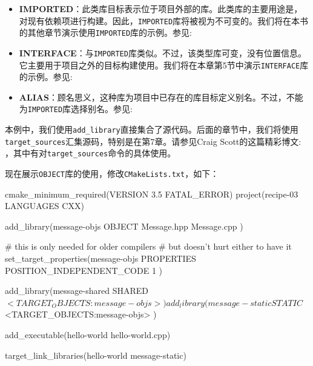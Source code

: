 \begin{itemize}
\item \textbf{IMPORTED}：此类库目标表示位于项目外部的库。此类库的主要用途是，对现有依赖项进行构建。因此，\texttt{IMPORTED}库将被视为不可变的。我们将在本书的其他章节演示使用\texttt{IMPORTED}库的示例。参见: 

\item \textbf{INTERFACE}：与\texttt{IMPORTED}库类似。不过，该类型库可变，没有位置信息。它主要用于项目之外的目标构建使用。我们将在本章第5节中演示\texttt{INTERFACE}库的示例。参见: 

\item \textbf{ALIAS}：顾名思义，这种库为项目中已存在的库目标定义别名。不过，不能为\texttt{IMPORTED}库选择别名。参见: 

\end{itemize}

本例中，我们使用\texttt{add\_library}直接集合了源代码。后面的章节中，我们将使用\texttt{target\_sources}汇集源码，特别是在第7章。请参见Craig Scott的这篇精彩博文:  ，其中有对\texttt{target\_sources}命令的具体使用。


现在展示\texttt{OBJECT}库的使用，修改\texttt{CMakeLists.txt}，如下：

\begin{codebox}[cmake]
cmake_minimum_required(VERSION 3.5 FATAL_ERROR)
project(recipe-03 LANGUAGES CXX)

add_library(message-objs
    OBJECT
        Message.hpp
        Message.cpp
    )
    
# this is only needed for older compilers
# but doesn't hurt either to have it
set_target_properties(message-objs
    PROPERTIES
        POSITION_INDEPENDENT_CODE 1
    )
    
add_library(message-shared
    SHARED
        $<TARGET_OBJECTS:message-objs>
    )
    
add_library(message-static
    STATIC
        $<TARGET_OBJECTS:message-objs>
    )
    
add_executable(hello-world hello-world.cpp)

target_link_libraries(hello-world message-static)
\end{codebox}

